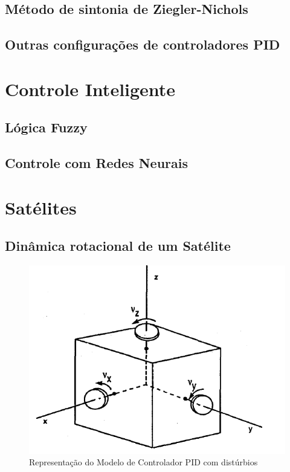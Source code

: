 \subsection{Método de sintonia de Ziegler-Nichols}

\subsection{Outras configurações de controladores PID}

\section{Controle Inteligente}

\subsection{Lógica Fuzzy}

\subsection{Controle com Redes Neurais}  %

\section{Satélites}

\subsection{Dinâmica rotacional de um Satélite}

\begin{figure}[htb]
  \caption{Representação do Modelo de Controlador PID com distúrbios}
  \begin{center}
      \includegraphics[scale=0.75]{img/satellite_controlhand_p1306}
  \end{center}
\end{figure}

